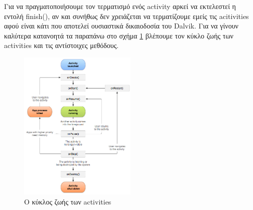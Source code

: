 		Για να πραγματοποιήσουμε τον τερματισμό ενός activity αρκεί να εκτελεστεί η εντολή finish(), αν και συνήθως δεν χρειάζεται να τερματίζουμε εμείς τις acitivities αφού είναι κάτι που αποτελεί ουσιαστικά δικαιοδοσία του Dalvik. Για να γίνουν καλύτερα κατανοητά τα παραπάνω στο σχήμα \ref{fig:activity_lifecycle} βλέπουμε τον κύκλο ζωής των activities και τις αντίστοιχες μεθόδους.
		
		\begin{figure}[h]
			\centering
			\includegraphics[width=0.5\textwidth]{activity_lifecycle.png}
			\caption{Ο κύκλος ζωής των activities}
			\label{fig:activity_lifecycle}
		\end{figure}
		
